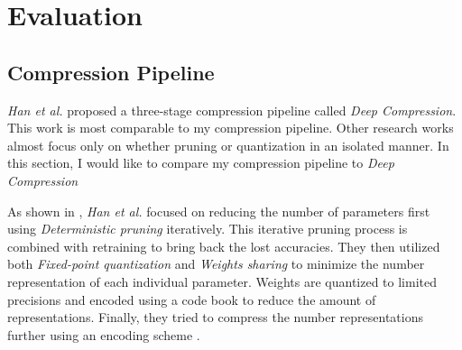 \documentclass[a4paper,12pt]{report}
\begin{document}
\chapter{Evaluation}
\section{Compression Pipeline}
\textit{Han et al.} proposed a three-stage compression pipeline called
\textit{Deep Compression}.
This work is most comparable to my compression pipeline.
Other research works almost focus only on whether pruning or quantization in an
isolated manner.
In this section, I would like to compare my compression pipeline to \textit{Deep Compression}

As shown in , \textit{Han et al.} focused on
reducing the number of parameters first using \textit{Deterministic pruning} iteratively.
This iterative pruning process is combined with retraining to bring back the lost
accuracies.
They then utilized both \textit{Fixed-point quantization} and \textit{Weights sharing}
to minimize the number representation of each individual parameter.
Weights are quantized to limited precisions and encoded using a code book
to reduce the amount of representations.
Finally, they tried to compress the number representations further using an
encoding scheme \cite{Han15}.
\end{document}

